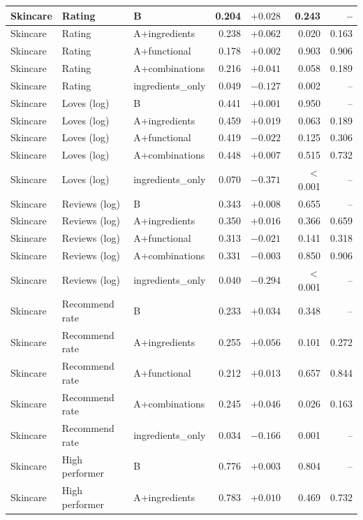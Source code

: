 \begin{table}[htbp]
\begin{tabular}{|l|l|l|r|r|r|r|}
\hline
\hline
Skincare & Rating & B & 0.204 & $+0.028$ & 0.243 & -- \\
\hline
Skincare & Rating & A+ingredients & 0.238 & $+0.062$ & 0.020 & 0.163 \\
\hline
Skincare & Rating & A+functional & 0.178 & $+0.002$ & 0.903 & 0.906 \\
\hline
Skincare & Rating & A+combinations & 0.216 & $+0.041$ & 0.058 & 0.189 \\
\hline
Skincare & Rating & ingredients\_only & 0.049 & $-0.127$ & 0.002 & -- \\
\hline
\hline
Skincare & Loves (log) & B & 0.441 & $+0.001$ & 0.950 & -- \\
\hline
Skincare & Loves (log) & A+ingredients & 0.459 & $+0.019$ & 0.063 & 0.189 \\
\hline
Skincare & Loves (log) & A+functional & 0.419 & $-0.022$ & 0.125 & 0.306 \\
\hline
Skincare & Loves (log) & A+combinations & 0.448 & $+0.007$ & 0.515 & 0.732 \\
\hline
Skincare & Loves (log) & ingredients\_only & 0.070 & $-0.371$ & $<$0.001 & -- \\
\hline
\hline
Skincare & Reviews (log) & B & 0.343 & $+0.008$ & 0.655 & -- \\
\hline
Skincare & Reviews (log) & A+ingredients & 0.350 & $+0.016$ & 0.366 & 0.659 \\
\hline
Skincare & Reviews (log) & A+functional & 0.313 & $-0.021$ & 0.141 & 0.318 \\
\hline
Skincare & Reviews (log) & A+combinations & 0.331 & $-0.003$ & 0.850 & 0.906 \\
\hline
Skincare & Reviews (log) & ingredients\_only & 0.040 & $-0.294$ & $<$0.001 & -- \\
\hline
\hline
Skincare & Recommend rate & B & 0.233 & $+0.034$ & 0.348 & -- \\
\hline
Skincare & Recommend rate & A+ingredients & 0.255 & $+0.056$ & 0.101 & 0.272 \\
\hline
Skincare & Recommend rate & A+functional & 0.212 & $+0.013$ & 0.657 & 0.844 \\
\hline
Skincare & Recommend rate & A+combinations & 0.245 & $+0.046$ & 0.026 & 0.163 \\
\hline
Skincare & Recommend rate & ingredients\_only & 0.034 & $-0.166$ & 0.001 & -- \\
\hline
\hline
Skincare & High performer & B & 0.776 & $+0.003$ & 0.804 & -- \\
\hline
Skincare & High performer & A+ingredients & 0.783 & $+0.010$ & 0.469 & 0.732 \\

\end{tabular}
\end{table}
